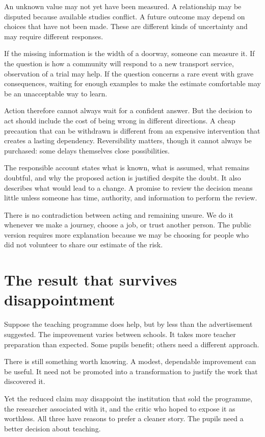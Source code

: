 \documentclass[12pt,a4paper]{book}
\begin{document}
An unknown value may not yet have been measured. A relationship may be disputed because available studies conflict. A future outcome may depend on choices that have not been made. These are different kinds of uncertainty and may require different responses.

If the missing information is the width of a doorway, someone can measure it. If the question is how a community will respond to a new transport service, observation of a trial may help. If the question concerns a rare event with grave consequences, waiting for enough examples to make the estimate comfortable may be an unacceptable way to learn.

Action therefore cannot always wait for a confident answer. But the decision to act should include the cost of being wrong in different directions. A cheap precaution that can be withdrawn is different from an expensive intervention that creates a lasting dependency. Reversibility matters, though it cannot always be purchased: some delays themselves close possibilities.

The responsible account states what is known, what is assumed, what remains doubtful, and why the proposed action is justified despite the doubt. It also describes what would lead to a change. A promise to review the decision means little unless someone has time, authority, and information to perform the review.

There is no contradiction between acting and remaining unsure. We do it whenever we make a journey, choose a job, or trust another person. The public version requires more explanation because we may be choosing for people who did not volunteer to share our estimate of the risk.

\section*{The result that survives disappointment}

Suppose the teaching programme does help, but by less than the advertisement suggested. The improvement varies between schools. It takes more teacher preparation than expected. Some pupils benefit; others need a different approach.

There is still something worth knowing. A modest, dependable improvement can be useful. It need not be promoted into a transformation to justify the work that discovered it.

Yet the reduced claim may disappoint the institution that sold the programme, the researcher associated with it, and the critic who hoped to expose it as worthless. All three have reasons to prefer a cleaner story. The pupils need a better decision about teaching.
\end{document}
